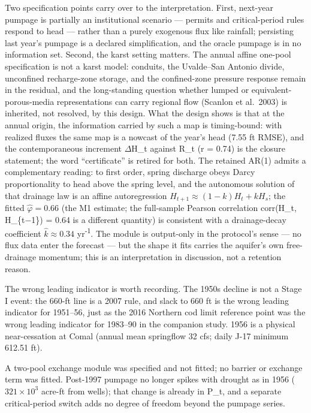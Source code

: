 \documentclass[11pt]{article}
\begin{document}
Two specification points carry over to the interpretation. First,
next-year pumpage is partially an institutional scenario --- permits and
critical-period rules respond to head --- rather than a purely exogenous
flux like rainfall; persisting last year's pumpage is a declared
simplification, and the oracle pumpage is in no information set. Second,
the karst setting matters. The annual affine one-pool specification is
not a karst model: conduits, the Uvalde--San Antonio divide, unconfined
recharge-zone storage, and the confined-zone pressure response remain in
the residual, and the long-standing question whether lumped or
equivalent-porous-media representations can carry regional flow (Scanlon
et al.~2003) is inherited, not resolved, by this design. What the design
shows is that at the annual origin, the information carried by such a
map is timing-bound: with realized fluxes the same map is a nowcast of
the year's head (7.55 ft RMSE), and the contemporaneous increment \ensuremath{\Delta}H\_t
against R\_t (r = 0.74) is the closure statement; the word
``certificate'' is retired for both. The retained AR(1) admits a
complementary reading: to first order, spring discharge obeys Darcy
proportionality to head above the spring level, and the autonomous
solution of that drainage law is an affine autoregression
\(H_{t+1} \approx (1-k)H_t + k H_s\); the fitted \(\hat\varphi = 0.66\)
(the M1 estimate; the full-sample Pearson correlation corr(H\_t,
H\_\{t\ensuremath{-}1\}) = 0.64 is a different quantity) is consistent with a
drainage-decay coefficient \(\hat k \approx 0.34\) yr\textsuperscript{-1}. The module is
output-only in the protocol's sense --- no flux data enter the forecast
--- but the shape it fits carries the aquifer's own free-drainage
momentum; this is an interpretation in discussion, not a retention
reason.

The wrong leading indicator is worth recording. The 1950s decline is not
a Stage I event: the 660-ft line is a 2007 rule, and slack to 660 ft is
the wrong leading indicator for 1951--56, just as the 2016 Northern cod
limit reference point was the wrong leading indicator for 1983--90 in
the companion study. 1956 is a physical near-cessation at Comal (annual
mean springflow 32 cfs; daily J-17 minimum 612.51 ft).

A two-pool exchange module was specified and not fitted; no barrier or
exchange term was fitted. Post-1997 pumpage no longer spikes with
drought as in 1956 (\(321 \times 10^3\) acre-ft from wells); that change
is already in P\_t, and a separate critical-period switch adds no degree
of freedom beyond the pumpage series.
\end{document}
